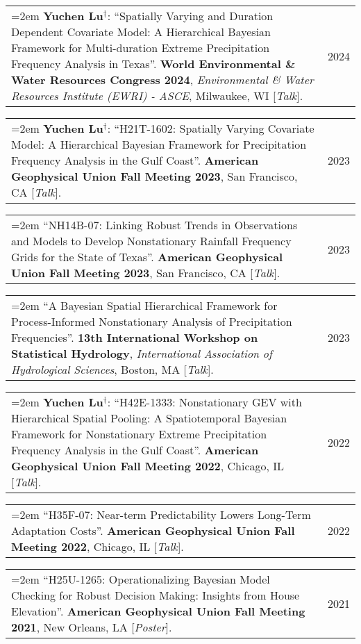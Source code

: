 \documentclass[10pt,oneside]{article}
\makeatletter
\newenvironment{alignedentrieshang}[1][2em]{%
  \noindent%
}{%
}
\newcommand{\hangingitem}[2]{%
  \noindent%
  \begin{tabular*}{\textwidth}{@{}p{0.85\textwidth}@{\extracolsep{\fill}}r@{}}%
    \hangindent=2em \hangafter=1 #1 & #2%
  \end{tabular*}%
}
\makeatother
\begin{document}
\begin{alignedentrieshang}
\hangingitem{\textcolor{RiceBlue}{\textbf{Yuchen Lu}}$^\mathbf{\dagger}$: \enquote{Spatially Varying and Duration Dependent Covariate Model: A Hierarchical Bayesian Framework for Multi-duration Extreme Precipitation Frequency Analysis in Texas}. \textbf{World Environmental \& Water Resources Congress 2024}, \textit{Environmental \& Water Resources Institute (EWRI) - ASCE}, Milwaukee, WI [\textit{Talk}].}{2024}



\hangingitem{\textcolor{RiceBlue}{\textbf{Yuchen Lu}}$^\mathbf{\dagger}$: \enquote{H21T-1602: Spatially Varying Covariate Model: A Hierarchical Bayesian Framework for Precipitation Frequency Analysis in the Gulf Coast}. \textbf{American Geophysical Union Fall Meeting 2023}, San Francisco, CA [\textit{Talk}].}{2023}



\hangingitem{\enquote{NH14B-07: Linking Robust Trends in Observations and Models to Develop Nonstationary Rainfall Frequency Grids for the State of Texas}. \textbf{American Geophysical Union Fall Meeting 2023}, San Francisco, CA [\textit{Talk}].}{2023}



\hangingitem{\enquote{A Bayesian Spatial Hierarchical Framework for Process-Informed Nonstationary Analysis of Precipitation Frequencies}. \textbf{13th International Workshop on Statistical Hydrology}, \textit{International Association of Hydrological Sciences}, Boston, MA [\textit{Talk}].}{2023}



\hangingitem{\textcolor{RiceBlue}{\textbf{Yuchen Lu}}$^\mathbf{\dagger}$: \enquote{H42E-1333: Nonstationary GEV with Hierarchical Spatial Pooling: A Spatiotemporal Bayesian Framework for Nonstationary Extreme Precipitation Frequency Analysis in the Gulf Coast}. \textbf{American Geophysical Union Fall Meeting 2022}, Chicago, IL [\textit{Talk}].}{2022}



\hangingitem{\enquote{H35F-07: Near-term Predictability Lowers Long-Term Adaptation Costs}. \textbf{American Geophysical Union Fall Meeting 2022}, Chicago, IL [\textit{Talk}].}{2022}



\hangingitem{\enquote{H25U-1265: Operationalizing Bayesian Model Checking for Robust Decision Making: Insights from House Elevation}. \textbf{American Geophysical Union Fall Meeting 2021}, New Orleans, LA [\textit{Poster}].}{2021}




\end{alignedentrieshang}
\end{document}
